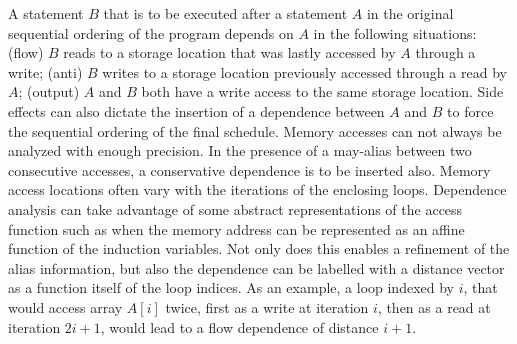 A statement $B$ that is to be executed after a statement $A$ in the original sequential ordering of the program depends on $A$ in the following situations: (flow) $B$ reads to a storage location that was lastly accessed by $A$ through a write; (anti) $B$ writes to a storage location previously accessed through a read by $A$; (output) $A$ and $B$ both have a write access to the same storage location. Side effects can also dictate the insertion of a dependence between $A$ and $B$ to force the sequential ordering of the final schedule. Memory accesses can not always be analyzed with enough precision. In the presence of a may-alias  between two consecutive accesses, a conservative dependence is to be inserted also. Memory access locations often vary with the iterations of the enclosing loops. Dependence analysis can take advantage of some abstract representations of the access function such as when the memory address can be represented as an affine function of the induction variables. 
Not only does this enables a refinement of the alias information, but also the dependence can be labelled with a distance vector as a function itself of the loop indices. As an example, a loop indexed by $i$, that would access array $A[i]$ twice, first as a write at iteration $i$, then as a read at iteration $2i+1$, would lead to a flow dependence of distance $i+1$. 

